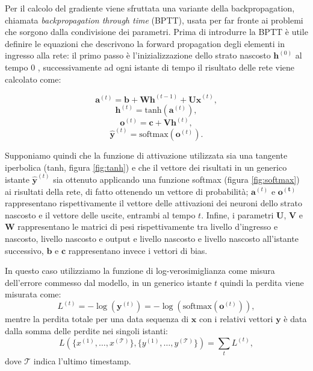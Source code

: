 \documentclass[../../main.tex]{subfiles}
\begin{document}
Per il calcolo del gradiente viene sfruttata una variante della  backpropagation, chiamata \textit{backpropagation through time} (BPTT), usata per far fronte ai problemi che sorgono dalla condivisione dei parametri. Prima di introdurre la BPTT è utile definire le equazioni che descrivono la forward propagation degli elementi in ingresso alla rete: il primo passo è l'inizializzazione dello strato nascosto $\boldsymbol{h}^{(0)}$ al tempo 0 , successivamente ad ogni istante di tempo il risultato delle rete viene calcolato come:
\begin{fleqn}[1cm]
    \begin{equation}
        \boldsymbol{a}^{(t)} = \boldsymbol{b} + \boldsymbol{W h}^{(t-1)} + \boldsymbol{U x}^{(t)},
    \end{equation}
    \begin{equation}
        \boldsymbol{h}^{(t)} = \mathrm{tanh}(\boldsymbol{a}^{(t)}),
    \end{equation}
    \begin{equation}
        \boldsymbol{o}^{(t)} = \boldsymbol{c} + \boldsymbol{V h}^{(t)},
    \end{equation}
    \begin{equation}
        \boldsymbol{\hat{y}}^{(t)} = \mathrm{softmax}(\boldsymbol{o}^{(t)}).
    \end{equation}
\end{fleqn}
Supponiamo quindi che la funzione di attivazione utilizzata sia una tangente iperbolica (tanh, figura \ref{fig:tanh}) e che il vettore dei risultati in un generico istante $\boldsymbol{\hat{y}}^{(t)}$ sia ottenuto applicando una funzione softmax (figura \ref{fig:softmax}) ai risultati della rete, di fatto ottenendo un vettore di probabilità; $\boldsymbol{a}^{(t)}$ e $\boldsymbol{o^{(t)}}$ rappresentano rispettivamente il vettore delle attivazioni dei neuroni dello strato nascosto e il vettore delle uscite, entrambi al tempo $t$. Infine, i parametri $\boldsymbol{U}$, $\boldsymbol{V}$ e $\boldsymbol{W}$ rappresentano le matrici di pesi rispettivamente tra livello d'ingresso e nascosto, livello nascosto e output e livello nascosto e livello nascosto all'istante successivo, $\boldsymbol{b}$ e $\boldsymbol{c}$ rappresentano invece i vettori di bias.

In questo caso utilizziamo la funzione di log-verosimiglianza come misura dell'errore commesso dal modello, in un generico istante $t$ quindi la perdita viene misurata come:
\[L^{(t)} = -\log(\boldsymbol{y}^{(t)}) = -\log(\mathrm{softmax}(\boldsymbol{o}^{(t)})),\]
mentre la perdita totale per una data sequenza di $\boldsymbol{x}$ con i relativi vettori $\boldsymbol{y}$ è data dalla somma delle perdite nei singoli istanti:
\[L(\{x^{(1)}, \dots, x^{(\mathcal{T})}\}, \{y^{(1)}, \dots, y^{(\mathcal{T})}\}) = \sum_t L^{(t)},\]
dove $\mathcal{T}$ indica l'ultimo timestamp.
\end{document}
